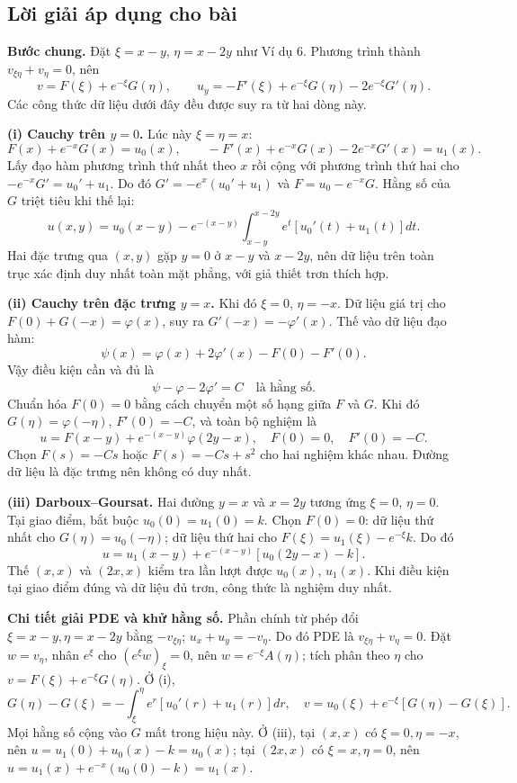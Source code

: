 \documentclass[10pt,a4paper]{article}
\begin{document}
\subsection*{Lời giải áp dụng cho bài}
\textbf{Bước chung.} Đặt $\xi=x-y$, $\eta=x-2y$ như Ví dụ 6. Phương trình thành $v_{\xi\eta}+v_\eta=0$, nên
\[v=F(\xi)+e^{-\xi}G(\eta),\qquad
u_y=-F'(\xi)+e^{-\xi}G(\eta)-2e^{-\xi}G'(\eta).\]
Các công thức dữ liệu dưới đây đều được suy ra từ hai dòng này.

\textbf{(i) Cauchy trên $y=0$.} Lúc này $\xi=\eta=x$:
\[F(x)+e^{-x}G(x)=u_0(x),\qquad
-F'(x)+e^{-x}G(x)-2e^{-x}G'(x)=u_1(x).\]
Lấy đạo hàm phương trình thứ nhất theo $x$ rồi cộng với phương trình thứ hai cho $-e^{-x}G'=u_0'+u_1$. Do đó $G'=-e^x(u_0'+u_1)$ và $F=u_0-e^{-x}G$. Hằng số của $G$ triệt tiêu khi thế lại:
\[\boxed{u(x,y)=u_0(x-y)-e^{-(x-y)}\int_{x-y}^{x-2y}e^t[u_0'(t)+u_1(t)]dt.}\]
Hai đặc trưng qua $(x,y)$ gặp $y=0$ ở $x-y$ và $x-2y$, nên dữ liệu trên toàn trục xác định duy nhất toàn mặt phẳng, với giả thiết trơn thích hợp.

\textbf{(ii) Cauchy trên đặc trưng $y=x$.} Khi đó $\xi=0$, $\eta=-x$. Dữ liệu giá trị cho $F(0)+G(-x)=\varphi(x)$, suy ra $G'(-x)=-\varphi'(x)$. Thế vào dữ liệu đạo hàm:
\[\psi(x)=\varphi(x)+2\varphi'(x)-F(0)-F'(0).\]
Vậy điều kiện cần và đủ là
\[\boxed{\psi-\varphi-2\varphi'=C\quad\text{là hằng số}.}\]
Chuẩn hóa $F(0)=0$ bằng cách chuyển một số hạng giữa $F$ và $G$. Khi đó $G(\eta)=\varphi(-\eta)$, $F'(0)=-C$, và toàn bộ nghiệm là
\[u=F(x-y)+e^{-(x-y)}\varphi(2y-x),\quad F(0)=0,\quad F'(0)=-C.\]
Chọn $F(s)=-Cs$ hoặc $F(s)=-Cs+s^2$ cho hai nghiệm khác nhau. Đường dữ liệu là đặc trưng nên không có duy nhất.

\textbf{(iii) Darboux--Goursat.} Hai đường $y=x$ và $x=2y$ tương ứng $\xi=0$, $\eta=0$. Tại giao điểm, bắt buộc $u_0(0)=u_1(0)=k$. Chọn $F(0)=0$: dữ liệu thứ nhất cho $G(\eta)=u_0(-\eta)$; dữ liệu thứ hai cho $F(\xi)=u_1(\xi)-e^{-\xi}k$. Do đó
\[\boxed{u=u_1(x-y)+e^{-(x-y)}[u_0(2y-x)-k].}\]
Thế $(x,x)$ và $(2x,x)$ kiểm tra lần lượt được $u_0(x)$, $u_1(x)$. Khi điều kiện tại giao điểm đúng và dữ liệu đủ trơn, công thức là nghiệm duy nhất.

\textbf{Chi tiết giải PDE và khử hằng số.} Phần chính từ phép đổi $\xi=x-y,\eta=x-2y$ bằng $-v_{\xi\eta}$; $u_x+u_y=-v_\eta$. Do đó PDE là $v_{\xi\eta}+v_\eta=0$. Đặt $w=v_\eta$, nhân $e^\xi$ cho $(e^\xi w)_\xi=0$, nên $w=e^{-\xi}A(\eta)$; tích phân theo $\eta$ cho $v=F(\xi)+e^{-\xi}G(\eta)$. Ở (i),
\[G(\eta)-G(\xi)=-\int_\xi^\eta e^r[u_0'(r)+u_1(r)]dr,\quad
v=u_0(\xi)+e^{-\xi}[G(\eta)-G(\xi)].\]
Mọi hằng số cộng vào $G$ mất trong hiệu này. Ở (iii), tại $(x,x)$ có $\xi=0,\eta=-x$, nên $u=u_1(0)+u_0(x)-k=u_0(x)$; tại $(2x,x)$ có $\xi=x,\eta=0$, nên $u=u_1(x)+e^{-x}(u_0(0)-k)=u_1(x)$.
\end{document}
